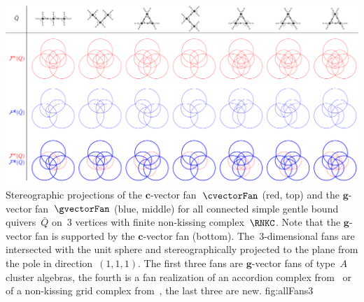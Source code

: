 \documentclass{amsart}
\theoremstyle{definition}
\renewcommand{\b}[1]{\mathbf{#1}} %
\begin{document}
\captionsetup{width=1.5\textwidth}
{\includegraphics[scale=.27]{allFans3}}
{Stereographic projections of the $\b{c}$-vector fan~$\cvectorFan$ (red, top) and the $\b{g}$-vector fan~$\gvectorFan$ (blue, middle) for all connected simple gentle bound quivers~$\bar Q$ on~$3$ vertices with finite non-kissing complex~$\RNKC$. Note that the $\b{g}$-vector fan is supported by the $\b{c}$-vector fan (bottom). The~$3$-dimensional fans are intersected with the unit sphere and stereographically projected to the plane from the pole in direction~$(1,1,1)$. The first three fans are $\b{g}$-vector fans of type~$A$ cluster algebras, the fourth is a fan realization of an accordion complex from~\cite{MannevillePilaud-accordion} or of a non-kissing grid complex from~\cite{GarverMcConville-grid}, the last three are new.}
{fig:allFans3}
\captionsetup{width=\textwidth}
\end{document}
